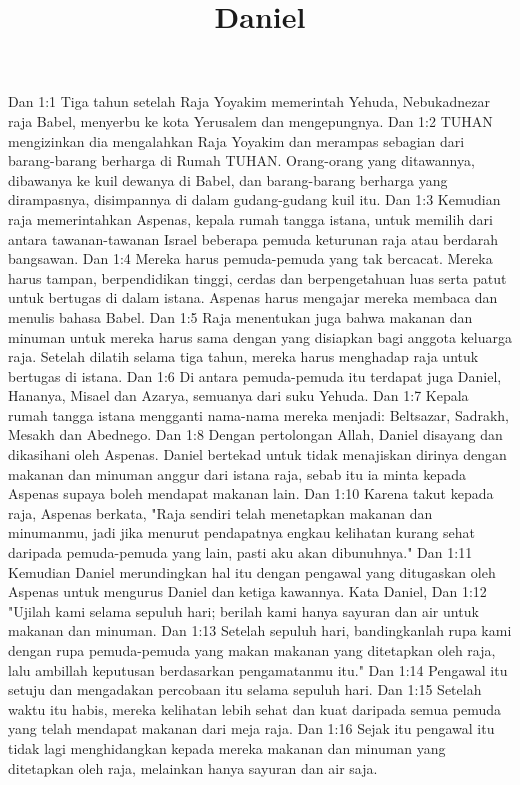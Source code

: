 

\title{Daniel}
Dan 1:1  Tiga tahun setelah Raja Yoyakim memerintah Yehuda, Nebukadnezar raja Babel, menyerbu ke kota Yerusalem dan mengepungnya.
Dan 1:2  TUHAN mengizinkan dia mengalahkan Raja Yoyakim dan merampas sebagian dari barang-barang berharga di Rumah TUHAN. Orang-orang yang ditawannya, dibawanya ke kuil dewanya di Babel, dan barang-barang berharga yang dirampasnya, disimpannya di dalam gudang-gudang kuil itu.
Dan 1:3  Kemudian raja memerintahkan Aspenas, kepala rumah tangga istana, untuk memilih dari antara tawanan-tawanan Israel beberapa pemuda keturunan raja atau berdarah bangsawan.
Dan 1:4  Mereka harus pemuda-pemuda yang tak bercacat. Mereka harus tampan, berpendidikan tinggi, cerdas dan berpengetahuan luas serta patut untuk bertugas di dalam istana. Aspenas harus mengajar mereka membaca dan menulis bahasa Babel.
Dan 1:5  Raja menentukan juga bahwa makanan dan minuman untuk mereka harus sama dengan yang disiapkan bagi anggota keluarga raja. Setelah dilatih selama tiga tahun, mereka harus menghadap raja untuk bertugas di istana.
Dan 1:6  Di antara pemuda-pemuda itu terdapat juga Daniel, Hananya, Misael dan Azarya, semuanya dari suku Yehuda.
Dan 1:7  Kepala rumah tangga istana mengganti nama-nama mereka menjadi: Beltsazar, Sadrakh, Mesakh dan Abednego.
Dan 1:8  Dengan pertolongan Allah, Daniel disayang dan dikasihani oleh Aspenas. Daniel bertekad untuk tidak menajiskan dirinya dengan makanan dan minuman anggur dari istana raja, sebab itu ia minta kepada Aspenas supaya boleh mendapat makanan lain.
Dan 1:10  Karena takut kepada raja, Aspenas berkata, "Raja sendiri telah menetapkan makanan dan minumanmu, jadi jika menurut pendapatnya engkau kelihatan kurang sehat daripada pemuda-pemuda yang lain, pasti aku akan dibunuhnya."
Dan 1:11  Kemudian Daniel merundingkan hal itu dengan pengawal yang ditugaskan oleh Aspenas untuk mengurus Daniel dan ketiga kawannya. Kata Daniel,
Dan 1:12  "Ujilah kami selama sepuluh hari; berilah kami hanya sayuran dan air untuk makanan dan minuman.
Dan 1:13  Setelah sepuluh hari, bandingkanlah rupa kami dengan rupa pemuda-pemuda yang makan makanan yang ditetapkan oleh raja, lalu ambillah keputusan berdasarkan pengamatanmu itu."
Dan 1:14  Pengawal itu setuju dan mengadakan percobaan itu selama sepuluh hari.
Dan 1:15  Setelah waktu itu habis, mereka kelihatan lebih sehat dan kuat daripada semua pemuda yang telah mendapat makanan dari meja raja.
Dan 1:16  Sejak itu pengawal itu tidak lagi menghidangkan kepada mereka makanan dan minuman yang ditetapkan oleh raja, melainkan hanya sayuran dan air saja.
